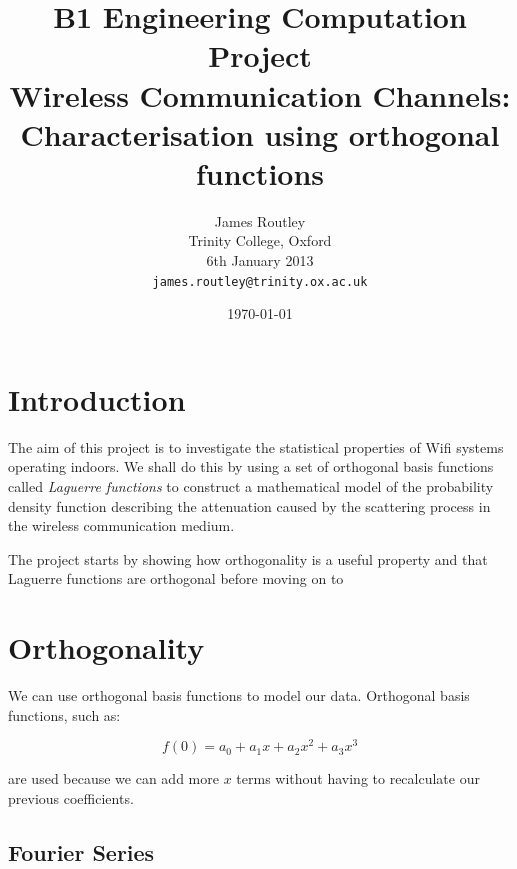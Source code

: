 \documentclass{article}
\begin{document}
\begin{titlepage}
\thispagestyle{empty}
\title{B1 Engineering Computation Project \\ Wireless Communication Channels: \\
Characterisation using orthogonal functions}
\author{James Routley \\
    Trinity College, Oxford \\
    6th January 2013 \\
    \texttt{james.routley@trinity.ox.ac.uk}}
\date{\today}
\maketitle    

\end{titlepage}





\section*{Introduction}


The aim of this project is to investigate the statistical properties of Wifi systems operating indoors. We shall do this by using a set of orthogonal basis functions called \emph{Laguerre functions} to construct a mathematical model of the probability density function describing the attenuation caused by the scattering process in the wireless communication medium. 

The project starts by showing how orthogonality is a useful property and that Laguerre functions are orthogonal before moving on to 


\section{Orthogonality}

We can use orthogonal basis functions to model our data. Orthogonal basis functions, such as:

$${f(0) = a_0 + a_1x + a_2x^2 + a_3x^3 }$$

\noindent are used because we can add more $x$ terms without having to recalculate our previous coefficients. 

\subsection{Fourier Series}
\end{document}
